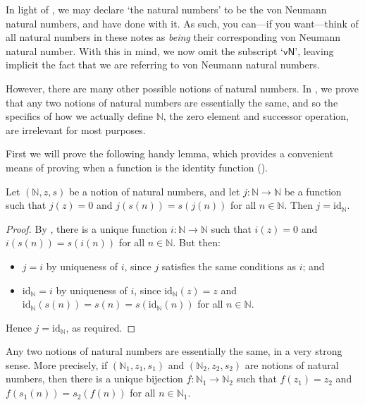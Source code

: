In light of , we may declare `the natural numbers' to be the von Neumann natural numbers, and have done with it. As such, you can---if you want---think of all natural numbers in these notes as \textit{being} their corresponding von Neumann natural number. With this in mind, we now omit the subscript `$\mathsf{vN}$', leaving implicit the fact that we are referring to von Neumann natural numbers.

However, there are many other possible notions of natural numbers. In , we prove that any two notions of natural numbers are essentially the same, and so the specifics of how we actually define $\mathbb{N}$, the zero element and successor operation, are irrelevant for most purposes.

First we will prove the following handy lemma, which provides a convenient means of proving when a function is the identity function ().

\begin{lemma}
\label{lemIdentityFromNNN}
Let $(\mathbb{\mathbb{N}}, z, s)$ be a notion of natural numbers, and let $j : \mathbb{N} \to \mathbb{N}$ be a function such that $j(z) = 0$ and $j(s(n)) = s(j(n))$ for all $n \in \mathbb{N}$. Then $j = \mathrm{id}_{\mathbb{N}}$.
\end{lemma}

\begin{proof}
By , there is a unique function $i : \mathbb{N} \to \mathbb{N}$ such that $i(z)=0$ and $i(s(n)) = s(i(n))$ for all $n \in \mathbb{N}$. But then:
\begin{itemize}
\item $j = i$ by uniqueness of $i$, since $j$ satisfies the same conditions as $i$; and
\item $\mathrm{id}_\mathbb{N} = i$ by uniqueness of $i$, since $\mathrm{id}_\mathbb{N}(z) = z$ and $\mathrm{id}_\mathbb{N}(s(n)) = s(n) = s(\mathrm{id}_\mathbb{N}(n))$ for all $n \in \mathbb{N}$.
\end{itemize}
Hence $j = \mathrm{id}_\mathbb{N}$, as required.
\end{proof}

\begin{theorem}
\label{thmNNNUnique}
Any two notions of natural numbers are essentially the same, in a very strong sense. More precisely, if $(\mathbb{N}_1, z_1, s_1)$ and $(\mathbb{N}_2, z_2, s_2)$ are notions of natural numbers, then there is a unique bijection $f : \mathbb{N}_1 \to \mathbb{N}_2$ such that $f(z_1) = z_2$ and $f(s_1(n)) = s_2(f(n))$ for all $n \in \mathbb{N}_1$.
\end{theorem}

